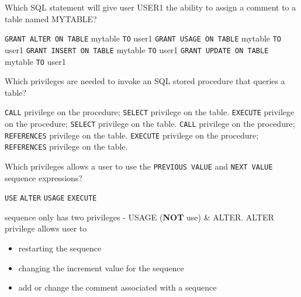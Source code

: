 \documentclass[answers, 11pt]{exam}
\begin{document}
\begin{questions}
\question[1]
Which SQL statement will give user USER1 the ability to assign a comment to a table named MYTABLE?
\begin{choices}
\CorrectChoice \texttt{GRANT ALTER ON TABLE} mytable \texttt{TO} user1
\choice \texttt{GRANT USAGE ON TABLE} mytable \texttt{TO} user1
\choice \texttt{GRANT INSERT ON TABLE} mytable \texttt{TO} user1
\choice \texttt{GRANT UPDATE ON TABLE} mytable \texttt{TO} user1
\end{choices}

\question[1]
Which privileges are needed to invoke an SQL stored procedure that queries a table?
\begin{choices}
\choice \texttt{CALL} privilege on the procedure; \texttt{SELECT} privilege on the table.
\CorrectChoice \texttt{EXECUTE} privilege on the procedure; \texttt{SELECT} privilege on the table.
\choice \texttt{CALL} privilege on the procedure; \texttt{REFERENCES} privilege on the table.
\choice \texttt{EXECUTE} privilege on the procedure; \texttt{REFERENCES} privilege on the table.
\end{choices}

\question[1]
Which privileges allows a user to use the \texttt{PREVIOUS VALUE} and \texttt{NEXT VALUE} sequence 
expressions?
\begin{choices}
\choice \texttt{USE}
\choice \texttt{ALTER}
\CorrectChoice \texttt{USAGE}
\choice \texttt{EXECUTE}
\end{choices}

\begin{solution}
sequence only has two privileges - USAGE (\textbf{NOT} use) \& ALTER. ALTER privilege allows  user to
\begin{itemize}
\item restarting the sequence
\item changing the increment value for the sequence
\item add or change the comment associated with a sequence
\end{itemize}
\end{solution}


\end{questions}
\end{document}
